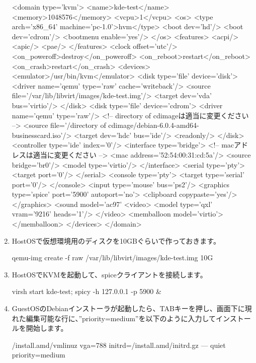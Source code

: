 \documentclass[mingoth,a4paper]{jsarticle}
\begin{document}
\begin{enumerate}
\begin{commandline}
<domain type='kvm'>
  <name>kde-test</name>
  <memory>1048576</memory>
  <vcpu>1</vcpu>
  <os>
    <type arch='x86_64' machine='pc-1.0'>hvm</type>
    <boot dev='hd'/>
    <boot dev='cdrom'/>
    <bootmenu enable='yes'/>
  </os>
  <features>
    <acpi/>
    <apic/>
    <pae/>
  </features>
  <clock offset='utc'/>
  <on_poweroff>destroy</on_poweroff>
  <on_reboot>restart</on_reboot>
  <on_crash>restart</on_crash>
  <devices>
    <emulator>/usr/bin/kvm</emulator>
    <disk type='file' device='disk'>
      <driver name='qemu' type='raw' cache='writeback'/>
      <source file='/var/lib/libvirt/images/kde-test.img'/>
      <target dev='vda' bus='virtio'/>
    </disk>
    <disk type='file' device='cdrom'>
      <driver name='qemu' type='raw'/>
<!-- directory of cdimageは適当に変更ください -->
      <source file='/directory of cdimage/debian-6.0.4-amd64-businesscard.iso'/>
      <target dev='hdc' bus='ide'/>
      <readonly/>
    </disk>
    <controller type='ide' index='0'/>
    <interface type='bridge'>
<!-- macアドレスは適当に変更ください -->
      <mac address='52:54:00:31:cd:5a'/>
      <source bridge='br0'/>
      <model type='virtio'/>
    </interface>
    <serial type='pty'>
      <target port='0'/>
    </serial>
    <console type='pty'>
      <target type='serial' port='0'/>
    </console>
    <input type='mouse' bus='ps2'/>
    <graphics type='spice' port='5900' autoport='no'>
      <clipboard copypaste='yes'/>
    </graphics>
    <sound model='ac97'\>
    <video>
      <model type='qxl' vram='9216' heads='1'/>
    </video>
    <memballoon model='virtio'>
    </memballoon>
  </devices>
</domain>
\end{commandline}
\item HostOSで仮想環境用のディスクを10GBぐらいで作っておきます。
\begin{commandline}
qemu-img create -f raw /var/lib/libvirt/images/kde-test.img 10G
\end{commandline}
\item HostOSでKVMを起動して、spiceクライアントを接続します。
\begin{commandline}
virsh start kde-test; spicy -h 127.0.0.1 -p 5900 &
\end{commandline}
\item GuestOSのDebianインストーラが起動したら、TABキーを押し、画面下に現れた編集可能な行に、''priority=medium''を以下のように入力してインストールを開始します。
\begin{commandline}
 /install.amd/vmlinuz vga=788 initrd=/install.amd/initrd.gz --- quiet priority=medium

\end{commandline}
\end{enumerate}
\end{document}
